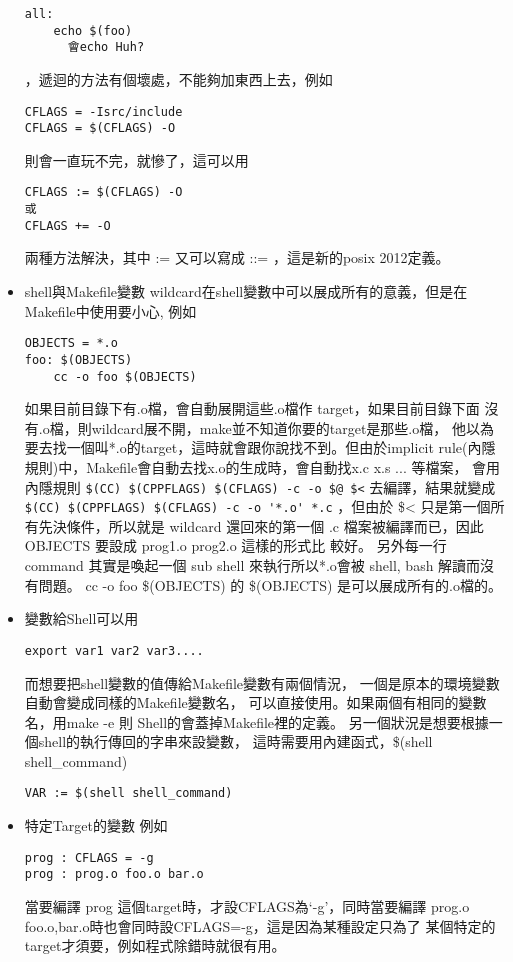 \begin{itemize}
\begin{verbatim}
all:
	echo $(foo)
	  會echo Huh?
          \end{verbatim}
          ，遞迴的方法有個壞處，不能夠加東西上去，例如
          \begin{verbatim}
CFLAGS = -Isrc/include
CFLAGS = $(CFLAGS) -O
          \end{verbatim}
	  則會一直玩不完，就慘了，這可以用
          \begin{verbatim}
CFLAGS := $(CFLAGS) -O
或
CFLAGS += -O
          \end{verbatim}
          兩種方法解決，其中 := 又可以寫成 ::= ，這是新的posix 2012定義。
    \item shell與Makefile變數
	  wildcard在shell變數中可以展成所有的意義，但是在Makefile中使用要小心,
          例如
          \begin{verbatim}
OBJECTS = *.o
foo: $(OBJECTS)
	cc -o foo $(OBJECTS)
          \end{verbatim}
          如果目前目錄下有.o檔，會自動展開這些.o檔作 target，如果目前目錄下面
          沒有.o檔，則wildcard展不開，make並不知道你要的target是那些.o檔，
	  他以為要去找一個叫*.o的target，這時就會跟你說找不到。但由於implicit
          rule(內隱規則)中，Makefile會自動去找x.o的生成時，會自動找x.c x.s ...
          等檔案， 會用內隱規則 \verb=$(CC) $(CPPFLAGS) $(CFLAGS) -c -o $@ $<=
          去編譯，結果就變成 \verb=$(CC) $(CPPFLAGS) $(CFLAGS) -c -o '*.o' *.c=
          ，但由於 \$< 只是第一個所有先決條件，所以就是 wildcard 還回來的第一個
          .c 檔案被編譯而已，因此 OBJECTS 要設成 prog1.o prog2.o 這樣的形式比
          較好。 另外每一行 command 其實是喚起一個 sub shell 來執行所以*.o會被
          shell, bash 解讀而沒有問題。
	  cc -o foo \$(OBJECTS) 的 \$(OBJECTS) 是可以展成所有的.o檔的。
	
    \item 變數給Shell可以用
          \begin{verbatim}
export var1 var2 var3....
          \end{verbatim}
	  而想要把shell變數的值傳給Makefile變數有兩個情況，
	  一個是原本的環境變數自動會變成同樣的Makefile變數名，
	  可以直接使用。如果兩個有相同的變數名，用make -e 則
	  Shell的會蓋掉Makefile裡的定義。
	  另一個狀況是想要根據一個shell的執行傳回的字串來設變數，
	  這時需要用內建函式，\$(shell shell\_command)
          \begin{verbatim}
VAR := $(shell shell_command)
          \end{verbatim}
    \item 特定Target的變數
	  例如
          \begin{verbatim}
prog : CFLAGS = -g
prog : prog.o foo.o bar.o
          \end{verbatim}
	  當要編譯 prog 這個target時，才設CFLAGS為`-g'，同時當要編譯
	  prog.o foo.o,bar.o時也會同時設CFLAGS=-g，這是因為某種設定只為了
	  某個特定的target才須要，例如程式除錯時就很有用。
  \end{itemize}

